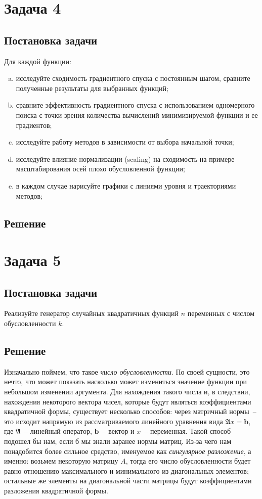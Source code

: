 \documentclass[12pt, a4paper, oneside]{article}
\begin{document}
	\section*{Задача 4}
	\subsection*{Постановка задачи}
	Для каждой функции:
	\begin{enumerate}[(a)]
		\item исследуйте сходимость градиентного спуска с постоянным шагом, сравните полученные результаты для выбранных функций;
		\item сравните эффективность градиентного спуска с использованием одномерного поиска с точки зрения количества вычислений минимизируемой функции и ее градиентов;
		\item исследуйте работу методов в зависимости от выбора начальной точки;
		\item исследуйте влияние нормализации (scaling) на сходимость на примере масштабирования осей плохо обусловленной функции;
		\item в каждом случае нарисуйте графики с линиями уровня и траекториями методов;
	\end{enumerate}
	\subsection*{Решение}
	\section*{Задача 5}
	\subsection*{Постановка задачи}
	Реализуйте генератор случайных квадратичных функций $n$ переменных с числом обусловленности $k$.
	\subsection*{Решение}
	Изначально поймем, что такое \textit{число обусловленности}. По своей сущности, это нечто, что может показать насколько может измениться значение функции при небольшом изменении аргумента. Для нахождения такого числа и, в следствии, нахождения некоторого вектора чисел, которые будут являться коэффициентами квадратичной формы, существует несколько способов: через матричный нормы~-- это исходит напрямую из рассматриваемого линейного уравнения вида $\mathfrak{A}x = \mathbf{b}$, где $\mathfrak{A}$~-- линейный оператор, $\mathbf{b}$~-- вектор и $x$~-- переменная. Такой способ подошел бы нам, если б мы знали заранее нормы матриц. Из-за чего нам понадобится более сильное средство, именуемое как \textit{сингулярное разложение}, а именно: возьмем некоторую матрицу $A$, тогда его число обусловленности будет равно отношению максимального и минимального из диагональных элементов; остальные же элементы на диагональной части матрицы будут коэффициентами разложения квадратичной формы.
\end{document}
